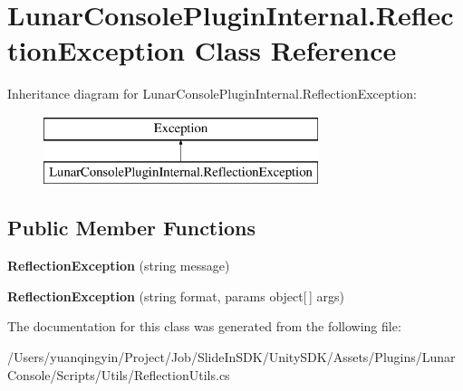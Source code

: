 \hypertarget{class_lunar_console_plugin_internal_1_1_reflection_exception}{}\section{Lunar\+Console\+Plugin\+Internal.\+Reflection\+Exception Class Reference}
\label{class_lunar_console_plugin_internal_1_1_reflection_exception}
Inheritance diagram for Lunar\+Console\+Plugin\+Internal.\+Reflection\+Exception\+:\begin{figure}[H]
\begin{center}
\leavevmode
\includegraphics[height=2.000000cm]{class_lunar_console_plugin_internal_1_1_reflection_exception}
\end{center}
\end{figure}
\subsection*{Public Member Functions}
\begin{DoxyCompactItemize}
\item 
\mbox{\label{class_lunar_console_plugin_internal_1_1_reflection_exception_aaf22ce702c486134b886646a12f643d1}} 
{\bfseries Reflection\+Exception} (string message)
\item 
\mbox{\label{class_lunar_console_plugin_internal_1_1_reflection_exception_a0b219d204437de51dc031d7c2c84a7f5}} 
{\bfseries Reflection\+Exception} (string format, params object\mbox{[}$\,$\mbox{]} args)
\end{DoxyCompactItemize}


The documentation for this class was generated from the following file\+:\begin{DoxyCompactItemize}
\item 
/\+Users/yuanqingyin/\+Project/\+Job/\+Slide\+In\+S\+D\+K/\+Unity\+S\+D\+K/\+Assets/\+Plugins/\+Lunar\+Console/\+Scripts/\+Utils/Reflection\+Utils.\+cs\end{DoxyCompactItemize}
